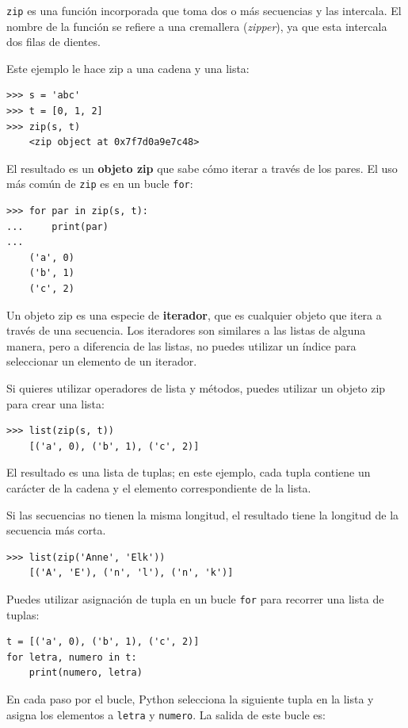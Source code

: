 \documentclass[10pt]{book}
\begin{document}
{\tt zip} es una función incorporada que toma dos o más secuencias y
las intercala.  El nombre de la función se refiere a
una cremallera ({\em zipper}), ya que esta intercala dos filas de dientes.

Este ejemplo le hace zip a una cadena y una lista:

\begin{verbatim}
>>> s = 'abc'
>>> t = [0, 1, 2]
>>> zip(s, t)
    <zip object at 0x7f7d0a9e7c48>
\end{verbatim}
%
El resultado es un {\bf objeto zip} que sabe cómo iterar a través
de los pares.  El uso más común de {\tt zip} es en un bucle {\tt for}:

\begin{verbatim}
>>> for par in zip(s, t):
...     print(par)
...
    ('a', 0)
    ('b', 1)
    ('c', 2)
\end{verbatim}
%
Un objeto zip es una especie de {\bf iterador}, que es cualquier objeto
que itera a través de una secuencia.  Los iteradores son similares a las listas de alguna
manera, pero a diferencia de las listas, no puedes utilizar un índice para seleccionar un elemento de
un iterador.

Si quieres utilizar operadores de lista y métodos, puedes
utilizar un objeto zip para crear una lista:

\begin{verbatim}
>>> list(zip(s, t))
    [('a', 0), ('b', 1), ('c', 2)]
\end{verbatim}
%
El resultado es una lista de tuplas; en este ejemplo, cada tupla contiene
un carácter de la cadena y el elemento correspondiente de
la lista.

Si las secuencias no tienen la misma longitud, el resultado tiene la
longitud de la secuencia más corta.

\begin{verbatim}
>>> list(zip('Anne', 'Elk'))
    [('A', 'E'), ('n', 'l'), ('n', 'k')]
\end{verbatim}
%
Puedes utilizar asignación de tupla en un bucle {\tt for} para recorrer una lista de
tuplas:

\begin{verbatim}
t = [('a', 0), ('b', 1), ('c', 2)]
for letra, numero in t:
    print(numero, letra)
\end{verbatim}
%
En cada paso por el bucle, Python selecciona la siguiente tupla en
la lista y asigna los elementos a {\tt letra} y
{\tt numero}.  La salida de este bucle es:
\end{document}
